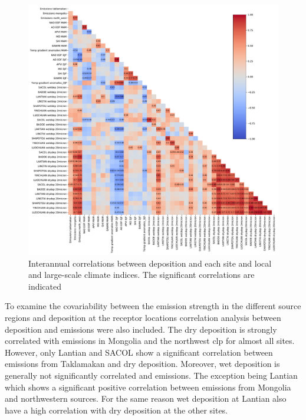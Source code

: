 \begin{figure}[htpb]
    \centering
    \includegraphics[width=\textwidth]{texfiles/figs/correlations.pdf}
    \caption{Interannual correlations between deposition and each site and local and large-scale climate indices. The significant correlations are indicated}
    \label{fig:correlations}
\end{figure}

To examine the covariability between the emission strength in the different source regions and deposition at the receptor locations correlation analysis between deposition and emissions were also included. 
The dry deposition is strongly correlated with emissions in Mongolia and the northwest \acrshort{clp} for almost all sites. However, only Lantian and SACOL show a significant correlation between emissions from Taklamakan and dry deposition. 
Moreover, wet deposition is generally not significantly correlated and emissions. 
The exception being Lantian which shows a significant positive correlation between emissions from Mongolia and northwestern sources. For the same reason wet deposition at Lantian also have a high correlation with dry deposition at the other sites.  




